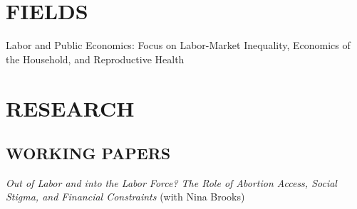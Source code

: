 \documentclass[margin]{res} %
\newcommand{\rootFolder}{/Users/tomzohar/Dropbox/}
\begin{document}
\begin{resume}
\begin{comment}
		 \item[] Prof. Liran Einav\\
		Economics Department, Stanford University \\
		(650) 723-3704 \\
		\textcolor{blue}{leinav@stanford.edu} \\

		 \item[] Asst. Prof. Isaac Sorkin\\
		Economics Department, Stanford University \\
		(608) 440-0052 \\
		\textcolor{blue}{sorkin@stanford.edu} \\

	\end{itemize}
\end{multicols}
\end{comment}

 
\section{FIELDS}  
 Labor and Public Economics: Focus on Labor-Market Inequality, Economics of the Household, and Reproductive Health
 

\section{ RESEARCH} 

\subsection{WORKING PAPERS}

\textit{Out of Labor and into the Labor Force? The Role of Abortion Access, Social Stigma, and Financial Constraints} (with Nina Brooks) 

%


\end{resume}
\end{document}
